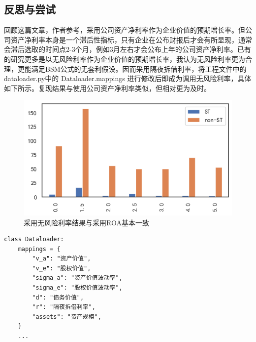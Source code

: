 \documentclass[a4paper,12pt]{ctexart}
\begin{document}
\subsection{反思与尝试}

回顾这篇文章，作者参考\citet{夏红芳2007基于}，采用公司资产净利率作为企业价值的预期增长率。但公司资产净利率本身是一个滞后性指标，只有企业在公布财报后才会有所显现，通常会滞后选取的时间点2-3个月，例如3月左右才会公布上年的公司资产净利率。已有的研究更多是以无风险利率作为企业价值的预期增长率，我认为无风险利率更为合理，更能满足BSM公式的无套利假设。因而采用隔夜拆借利率，将工程文件中的 dataloader.py中的 Dataloader.mappings 进行修改后即成为调用无风险利率，具体如下所示。复现结果与使用公司资产净利率类似，但相对更为及时。
\begin{figure}[H]
    \includegraphics[width=\linewidth]{fig/output.png}
    \caption{采用无风险利率结果与采用ROA基本一致}
\end{figure}
\begin{verbatim}
class Dataloader:
    mappings = {
        "v_a": "资产价值",
        "v_e": "股权价值",
        "sigma_a": "资产价值波动率",
        "sigma_e": "股权价值波动率",
        "d": "债务价值",
        "r": "隔夜拆借利率",
        "assets": "资产规模",
    }
    ...
\end{verbatim}
\end{document}
